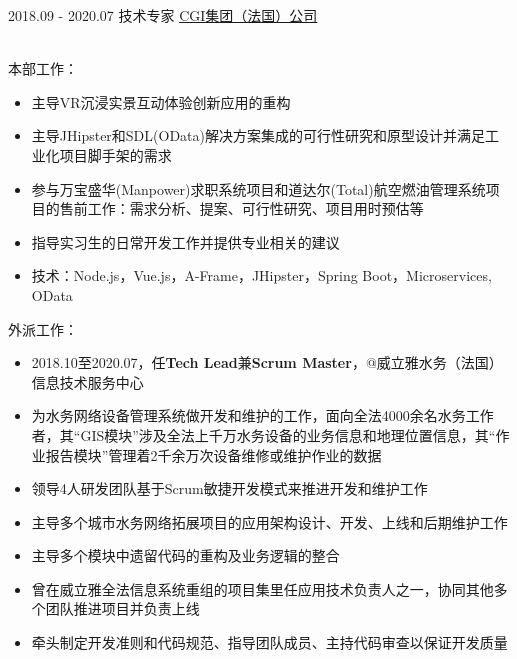 \documentclass[letterpaper]{twentysecondcv} %
\begin{document}
\vspace{-0.2cm}

\begin{twentyfluid}

\twentyitemfluid
    {2018.09 - 2020.07}
    {技术专家}
    {\href{https://www.cgi.fr/fr-fr}{CGI集团（法国）公司}}
    {\\     }
    {
    {
    \\
    本部工作：
    \begin{itemize}
        \item 主导VR沉浸实景互动体验创新应用的重构
        \item 主导JHipster和SDL(OData)解决方案集成的可行性研究和原型设计并满足工业化项目脚手架的需求
        \item 参与万宝盛华(Manpower)求职系统项目和道达尔(Total)航空燃油管理系统项目的售前工作：需求分析、提案、可行性研究、项目用时预估等
        \item 指导实习生的日常开发工作并提供专业相关的建议
        \item 技术：Node.js，Vue.js，A-Frame，JHipster，Spring Boot，Microservices, OData
    \end{itemize}
    外派工作：
    \begin{itemize}
        \item 2018.10至2020.07，任\textbf{Tech Lead}兼\textbf{Scrum Master}，@威立雅水务（法国）信息技术服务中心
        \item 为水务网络设备管理系统做开发和维护的工作，面向全法4000余名水务工作者，其``GIS模块''涉及全法上千万水务设备的业务信息和地理位置信息，其``作业报告模块''管理着2千余万次设备维修或维护作业的数据
        \item 领导4人研发团队基于Scrum敏捷开发模式来推进开发和维护工作
        \item 主导多个城市水务网络拓展项目的应用架构设计、开发、上线和后期维护工作
        \item 主导多个模块中遗留代码的重构及业务逻辑的整合
        \item 曾在威立雅全法信息系统重组的项目集里任应用技术负责人之一，协同其他多个团队推进项目并负责上线
        \item 牵头制定开发准则和代码规范、指导团队成员、主持代码审查以保证开发质量

\end{itemize}}}
\end{twentyfluid}
\end{document}
